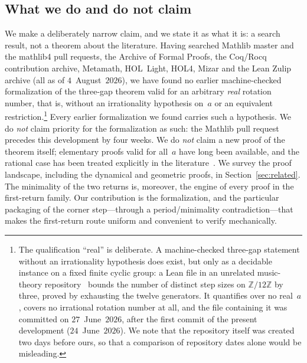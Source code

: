 \documentclass[11pt,reqno]{amsart}
\theoremstyle{plain}
\theoremstyle{definition}
\theoremstyle{remark}
\newcommand{\Z}{\mathbb{Z}}
\begin{document}
\subsection*{What we do and do not claim}
We make a deliberately narrow claim, and we state it as what it is: a search
result, not a theorem about the literature.  Having searched Mathlib master
and the mathlib4 pull requests, the Archive of Formal Proofs, the Coq/Rocq
contribution archive, Metamath, HOL~Light, HOL4, Mizar and the Lean Zulip
archive (all as of $4$~August~$2026$), we have found no earlier
machine-checked formalization of the three-gap theorem valid for an arbitrary
\emph{real} rotation number, that is, without an irrationality hypothesis
on~$a$ or an equivalent restriction.\footnote{The qualification
``real'' is deliberate.  A machine-checked three-gap statement without an
irrationality hypothesis does exist, but only as a decidable instance on a
fixed finite cyclic group: a Lean file in an unrelated music-theory
repository~\cite{MusicMath2026} bounds the number of distinct step sizes on
$\Z/12\Z$ by three, proved by exhausting the twelve generators.  It
quantifies over no real~$a$, covers no irrational rotation number at all, and
the file containing it was committed on $27$~June~$2026$, after the first
commit of the present development ($24$~June~$2026$).  We note that the
repository itself was created two days before ours, so that a comparison of
repository dates alone would be misleading.}  Every earlier formalization we
found carries such a hypothesis.  We do \emph{not} claim priority for the
formalization as such: the Mathlib pull request~\cite{SaarShai2026} precedes
this development by four weeks.  We do \emph{not}
claim a new proof of the theorem itself; elementary proofs valid for
all~$a$ have long been available, and the rational case has been treated
explicitly in the literature~\cite{AlessandriBerthe1998}.  We
survey the proof landscape, including the dynamical and geometric proofs, in
Section~\ref{sec:related}.  The minimality of the two returns is, moreover,
the engine of every proof in the first-return family.  Our contribution is the
formalization, and the particular packaging of the corner step---through a
period/minimality contradiction---that makes the first-return route uniform and
convenient to verify mechanically.
\end{document}
